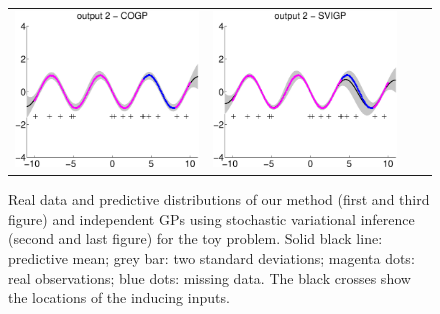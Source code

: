 \begin{figure}
\begin{tabular}{cccc}
\includegraphics[scale=0.2]{figures/toy-slfm-y2.eps} &
\includegraphics[scale=0.2]{figures/toy-svigp-y2.eps}
\end{tabular}
\caption{Real data and predictive distributions of our method (first and third figure) and independent GPs using stochastic variational inference (second and last figure) for the toy problem. Solid black line: predictive mean; grey bar: two standard deviations; magenta dots: real observations; blue dots: missing data. The black crosses show the locations of the inducing inputs.}
\label{fig:toy}
\end{figure}

